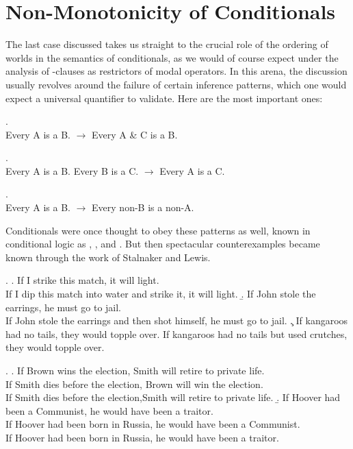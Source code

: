 \section{Non-Monotonicity of Conditionals}

The last case discussed takes us straight to the crucial role of the ordering of worlds in the semantics of conditionals, as we would of course expect under the analysis of -clauses as restrictors of modal operators. In this arena, the discussion usually revolves around the failure of certain inference patterns, which one would expect a universal quantifier to validate. Here are the most important ones:

\ex. \\[3pt]
Every A is a B. $\rightarrow$ Every A \& C is a B.

\ex. \\[3pt]
Every A is a B. Every B is a C. $\rightarrow$ Every A is a C.

\ex. \\[3pt]
Every A is a B. $\rightarrow$ Every non-B is a non-A.

Conditionals were once thought to obey these patterns as well, known in conditional logic as , , and . But then spectacular counterexamples became known through the work of Stalnaker and Lewis.

\ex.  \a. If I strike this match, it will light.\\
If I dip this match into water and strike it, it will light. \b. \label{SAb}If John stole the earrings, he must go to jail.\\
If John stole the earrings and then shot himself, he must go to jail. \c. If kangaroos had no tails, they would topple over. If kangaroos had no tails but used crutches, they would topple over.

\ex.  \a. If Brown wins the election, Smith will retire to private life.\\
If Smith dies before the election, Brown will win the election.\\
If Smith dies before the election,Smith will retire to private life. \b. If Hoover had been a Communist, he would have been a traitor.\\
If Hoover had been born in Russia, he would have been a Communist.\\
If Hoover had been born in Russia, he would have been a traitor.

